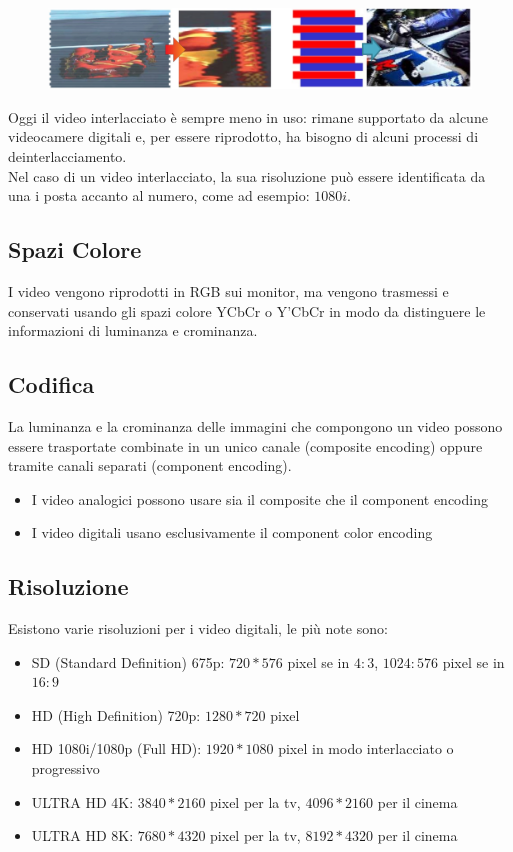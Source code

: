 \documentclass[a4paper,11pt]{article} %
\begin{document}
\begin{figure} [h]
\centering
\includegraphics[width=\textwidth]{Interlacing effects}
\end{figure}
Oggi il video interlacciato è sempre meno in uso: rimane supportato da alcune videocamere digitali e, per essere riprodotto, ha bisogno di alcuni processi di deinterlacciamento. \\
Nel caso di un video interlacciato, la sua risoluzione può essere identificata da una i posta accanto al numero, come ad esempio: $1080i$.

\subsection{Spazi Colore}
I video vengono riprodotti in RGB sui monitor, ma vengono trasmessi e conservati usando gli spazi colore YCbCr o Y'CbCr in modo da distinguere le informazioni di luminanza e crominanza. 

\subsection{Codifica}
La luminanza e la crominanza delle immagini che compongono un video possono essere trasportate combinate in un unico canale (composite encoding) oppure tramite canali separati (component encoding). 
\begin{itemize}
\item I video analogici possono usare sia il composite che il component encoding
\item I video digitali usano esclusivamente il component color encoding
\end{itemize}

\subsection{Risoluzione}
Esistono varie risoluzioni per i video digitali, le più note sono: 
\begin{itemize}
\item SD (Standard Definition) 675p: $720*576$ pixel se in $4:3$, $1024:576$ pixel se in $16:9$
\item HD (High Definition) 720p: $1280*720$ pixel
\item HD 1080i/1080p (Full HD): $1920*1080$ pixel in modo interlacciato o progressivo
\item ULTRA HD 4K: $3840*2160$ pixel per la tv, $4096*2160$ per il cinema
\item ULTRA HD 8K: $7680*4320$ pixel per la tv, $8192*4320$ per il cinema
\end{itemize}
\end{document}
